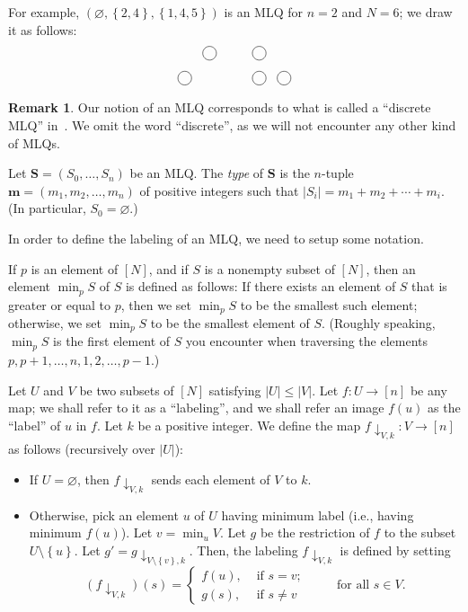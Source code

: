 \documentclass[reqno]{amsart}
\newcommand{\0}{\phantom{c}}
\newcommand{\mm}{\mathbf{m}}
\newcommand{\MLQ}{\mathbf{S}}
\newcommand{\set}[1]{\left\{ #1 \right\}}
\newcommand{\abs}[1]{\left| #1 \right|}
\newcommand{\tup}[1]{\left( #1 \right)}
\newcommand{\ive}[1]{\left[ #1 \right]}
\newcommand{\mlnode}[1]{\node[circle, draw=black] at (#1){\phantom{c}};}
\newcommand{\defn}[1]{{\color{darkred}\emph{#1}}} %
\theoremstyle{plain}
\theoremstyle{definition}
\newtheorem{remark}[thm]{Remark}
\numberwithin{equation}{section}
\begin{document}
For example, $\tup{\varnothing, \set{2, 4}, \set{1, 4, 5}}$
is an MLQ for $n = 2$ and $N = 6$; we draw it as follows:
\[
\begin{tikzpicture}[scale=0.7, every node/.style={scale=0.7}]
  \mlnode{2, 2}
  \mlnode{4, 2}
  \mlnode{1, 1}
  \mlnode{4, 1}
  \mlnode{5, 1}
\end{tikzpicture}
\]

\begin{remark}
Our notion of an MLQ corresponds to what is called a ``discrete MLQ'' in~\cite[\S 2.2]{AasLin17}.
We omit the word ``discrete'', as we will not encounter any other kind of MLQs.
\end{remark}

Let $\MLQ = (S_0, \dotsc, S_n)$ be an MLQ.
The \defn{type} of $\MLQ$ is the  $n$-tuple $\mm = \tup{m_1, m_2, \ldots, m_n}$ of
positive
integers such that $\abs{S_i} = m_1 + m_2 + \cdots + m_i$.
(In particular, $S_0 = \varnothing$.)

In order to define the labeling of an MLQ, we need to setup some notation.

If $p$ is an element of $\ive{N}$,
and if $S$ is a nonempty subset of $\ive{N}$,
then an element $\min_p S$ of $S$ is defined as follows:
If there exists an element of $S$ that is greater
or equal to $p$, then we set $\min_p S$ to be the
smallest such element;
otherwise, we set $\min_p S$ to be the smallest
element of $S$.
(Roughly speaking, $\min_p S$ is the first element
of $S$ you encounter when traversing the elements
$p, p+1, \ldots, n, 1, 2, \ldots, p-1$.)

Let $U$ and $V$ be two subsets of $\ive{N}$ satisfying
$\abs{U} \leq \abs{V}$.
Let $f \colon U \to \ive{n}$ be any map; we shall
refer to it as a ``labeling'', and we shall refer an
image $f \tup{u}$ as the ``label'' of $u$ in $f$.
Let $k$ be a positive integer.
We define the map $f \downarrow_{V, k} : V \to \ive{n}$
as follows (recursively over $\abs{U}$):

\begin{itemize}
 \item If $U = \varnothing$, then $f \downarrow_{V, k}$ sends
       each element of $V$ to $k$.
 \item Otherwise, pick an element $u$ of $U$ having minimum
       label (i.e., having minimum $f \tup{u}$).
       Let $v = \min_u V$.
       Let $g$ be the restriction of $f$ to the subset
       $U \setminus \set{u}$.
       Let $g' = g \downarrow_{V \setminus \set{v}, k}$.
       Then, the labeling $f \downarrow_{V, k}$ is defined by
       setting
       \[
        \tup{f \downarrow_{V, k}} \tup{s}
        =
        \begin{cases}
         f \tup{u}, & \text{ if } s = v; \\
         g \tup{s}, & \text{ if } s \neq v
        \end{cases}
        \qquad \text{ for all } s \in V .
       \]
\end{itemize}
\end{document}
